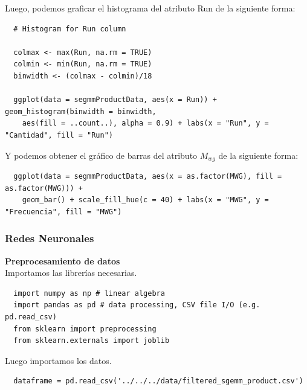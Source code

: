 \documentclass[osajnl,twocolumn,showpacs,superscriptaddress,10pt]{revtex4-1} %
\begin{document}
Luego, podemos graficar el histograma del atributo Run de la siguiente forma:

\begin{verbatim}
  # Histogram for Run column

  colmax <- max(Run, na.rm = TRUE)
  colmin <- min(Run, na.rm = TRUE)
  binwidth <- (colmax - colmin)/18

  ggplot(data = segmmProductData, aes(x = Run)) + geom_histogram(binwidth = binwidth,
    aes(fill = ..count..), alpha = 0.9) + labs(x = "Run", y = "Cantidad", fill = "Run")
\end{verbatim}

Y podemos obtener el gráfico de barras del atributo $M_{wg}$ de la siguiente forma:

\begin{verbatim}
  ggplot(data = segmmProductData, aes(x = as.factor(MWG), fill = as.factor(MWG))) +
    geom_bar() + scale_fill_hue(c = 40) + labs(x = "MWG", y = "Frecuencia", fill = "MWG")
\end{verbatim}

\subsubsection{Redes Neuronales}

\textbf{Preprocesamiento de datos} \\

Importamos las librerías necesarias.

\begin{verbatim}
  import numpy as np # linear algebra
  import pandas as pd # data processing, CSV file I/O (e.g. pd.read_csv)
  from sklearn import preprocessing
  from sklearn.externals import joblib
\end{verbatim}

Luego importamos los datos.

\begin{verbatim}
  dataframe = pd.read_csv('../../../data/filtered_sgemm_product.csv')
\end{verbatim}
\end{document}
